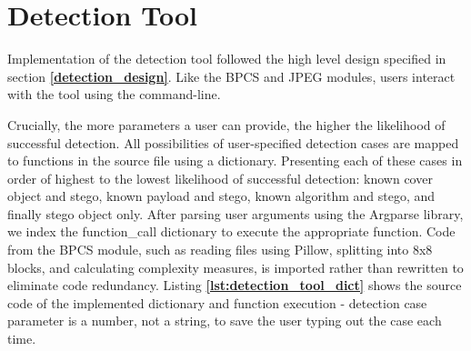 \documentclass{l4proj}
\begin{document}
\section{Detection Tool}\label{implementation_detection_tool}

Implementation of the detection tool followed the high level design specified in section \textbf{\ref{detection_design}}. Like the BPCS and JPEG modules, users interact with the tool using the command-line. 

Crucially, the more parameters a user can provide, the higher the likelihood of successful detection. All possibilities of user-specified detection cases are mapped to functions in the source file using a dictionary. Presenting each of these cases in order of highest to the lowest likelihood of successful detection: known cover object and stego, known payload and stego, known algorithm and stego, and finally stego object only. After parsing user arguments using the Argparse library, we index the function\_call dictionary to execute the appropriate function. Code from the BPCS module, such as reading files using Pillow, splitting into 8x8 blocks, and calculating complexity measures, is imported rather than rewritten to eliminate code redundancy. Listing \textbf{\ref{lst:detection_tool_dict}} shows the source code of the implemented dictionary and function execution - detection case parameter is a number, not a string, to save the user typing out the case each time.
\end{document}
